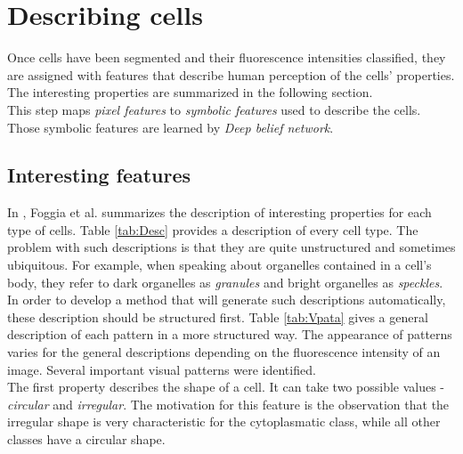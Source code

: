 
\chapter{Describing cells} %

\label{Chapter6} %


Once cells have been segmented and their fluorescence intensities classified, they are assigned with features that describe human perception of the cells' properties. The interesting properties are summarized in the following section. \\

This step maps \textit{pixel features} to \textit{symbolic features} used to describe the cells. Those symbolic features are learned by \textit{Deep belief network}.



\section{Interesting features}

In \cite{FoggiaBenchmarks2013}, Foggia et al. summarizes the description of interesting properties for each type of cells. Table \ref{tab:Desc} provides a description of every cell type. The problem with such descriptions is that they are quite unstructured and sometimes ubiquitous. For example, when speaking about organelles contained in a cell's body, they refer to dark organelles as \textit{granules} and bright organelles as \textit{speckles}. \\

In order to develop a method that will generate such descriptions automatically, these description should be structured first. Table \ref{tab:Vpata} gives a general description of each pattern in a more structured way. The appearance of patterns varies for the general descriptions depending on the fluorescence intensity of an image. Several important visual patterns were identified. \\

The first property describes the shape of a cell. It can take two possible values - \textit{circular} and \textit{irregular}. The motivation for this feature is the observation that the irregular shape is very characteristic for the cytoplasmatic class, while all other classes have a circular shape. \\


